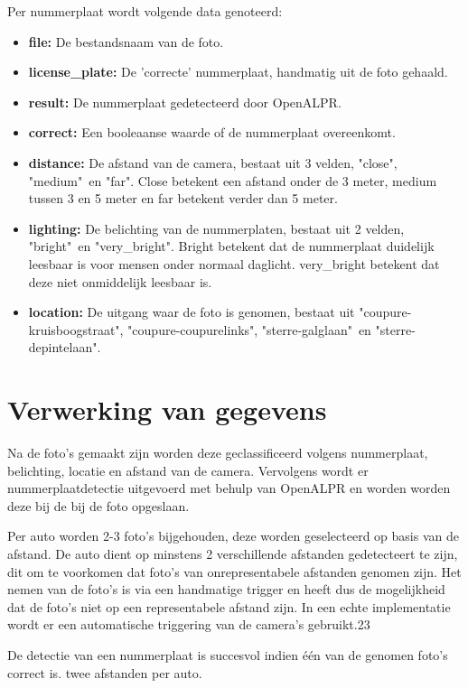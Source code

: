 Per nummerplaat wordt volgende data genoteerd:
\begin{itemize}
	\item \textbf{file:} De bestandsnaam van de foto.
	\item \textbf{license\_plate:} De 'correcte' nummerplaat, handmatig uit de foto gehaald.
	\item \textbf{result:} De nummerplaat gedetecteerd door OpenALPR.
	\item \textbf{correct:} Een booleaanse waarde of de nummerplaat overeenkomt.
	\item \textbf{distance:} De afstand van de camera, bestaat uit 3 velden, "close", "medium"\ en "far". Close betekent een afstand onder de 3 meter, medium tussen 3 en 5 meter en far betekent verder dan 5 meter.
	\item \textbf{lighting:} De belichting van de nummerplaten, bestaat uit 2 velden, "bright"\ en "very\_bright". Bright betekent dat de nummerplaat duidelijk leesbaar is voor mensen onder normaal daglicht. very\_bright betekent dat deze niet onmiddelijk leesbaar is.
	\item \textbf{location:} De uitgang waar de foto is genomen, bestaat uit "coupure-kruisboogstraat", "coupure-coupurelinks", "sterre-galglaan"\ en "sterre-depintelaan".
\end{itemize}

\section{Verwerking van gegevens}

Na de foto's gemaakt zijn worden deze geclassificeerd volgens nummerplaat, belichting, locatie en afstand van de camera. Vervolgens wordt er nummerplaatdetectie uitgevoerd met behulp van OpenALPR en worden worden deze bij de bij de foto opgeslaan.

Per auto worden 2-3 foto's bijgehouden, deze worden geselecteerd op basis van de afstand. De auto dient op minstens 2 verschillende afstanden gedetecteert te zijn, dit om te voorkomen dat foto's van onrepresentabele afstanden genomen zijn. Het nemen van de foto's is via een handmatige trigger en heeft dus de mogelijkheid dat de foto's niet op een representabele afstand zijn. In een echte implementatie wordt er een automatische triggering van de camera's gebruikt.23

De detectie van een nummerplaat is succesvol indien één van de genomen foto's correct is.
twee afstanden per auto.

